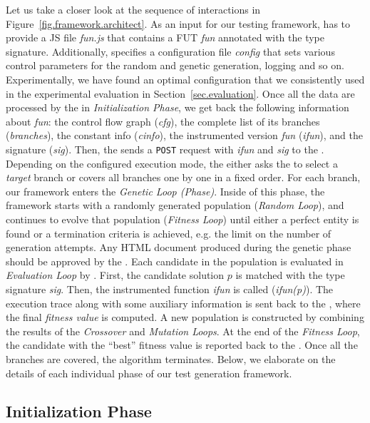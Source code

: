 Let us take a closer look at the sequence of interactions in Figure~\ref{fig.framework.architect}. As an input for our testing framework, \User has to provide a JS file \emph{fun.js} that contains a FUT \emph{fun} annotated with the type signature. Additionally, \User specifies a configuration file \emph{config} that sets various control parameters for the random and genetic generation, logging and so on. Experimentally, we have found an optimal configuration that we consistently used in the experimental evaluation in Section~\ref{sec.evaluation}. Once all the data are processed by the \Server in \emph{Initialization Phase}, we get back the following information about \emph{fun}: the control flow graph (\emph{cfg}), the complete list of its branches (\emph{branches}), the constant info (\emph{cinfo}), the instrumented version \emph{fun} (\emph{ifun}), and the signature (\emph{sig}). Then, the \Server sends a \texttt{POST} request with \emph{ifun} and \emph{sig} to the \Client. Depending on the configured execution mode, the \Server either asks the \User to select a \emph{target} branch or covers all branches one by one in a fixed order. For each branch, our framework enters the \emph{Genetic Loop (Phase)}. Inside of this phase, the framework starts with a randomly generated population (\emph{Random Loop}), and continues to evolve that population (\emph{Fitness Loop}) until either a perfect entity is found or a termination criteria is achieved, e.g. the limit on the number of generation attempts. Any HTML document produced during the genetic phase should be approved by the \Validator. Each candidate in the population is evaluated in \emph{Evaluation Loop} by \Client. First, the candidate solution $p$ is matched with the type signature \emph{sig}. Then, the instrumented function \emph{ifun} is called (\emph{ifun(p)}). The execution trace along with some auxiliary information is sent back to the \Server, where the final \emph{fitness value} is computed. A new population is constructed by combining the results of the \emph{Crossover} and \emph{Mutation Loops}. At the end of the \emph{Fitness Loop}, the candidate with the ``best'' fitness value is reported back to the \User. Once all the branches are covered, the algorithm terminates. Below, we elaborate on the details of each individual phase of our test generation framework.

\subsection{Initialization Phase}
\label{sub.sec.init.phase}

